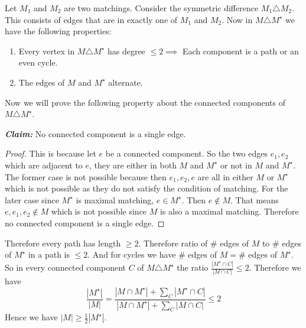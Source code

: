 \begin{alternate-proof} 
	Let $M_1$ and $M_2$ are two matchings. Consider the symmetric difference $M_1\triangle M_2$.  This consists of edges that are in exactly one of $M_1$ and $M_2$. Now in $M\triangle M^{\star}$ we have the following properties:
	\begin{enumerate}[label=(\alph*)]
		\item Every vertex in $M\triangle M^{\star}$ has degree $\leq 2\implies $ Each component is a path or an even cycle. 
		\item The edges of $M$ and $M^{\star}$ alternate. 
			\end{enumerate}
		Now we will prove the following property about the connected components of $M\triangle M^{\star}$.
		
\begin{center}
					
	\begin{minipage}{0.9\textwidth}
			\textit{\textbf{Claim:}}\hspace{1em} No connected component is a single edge. 
		
		\begin{proof}
			This is because let $e$ be a connected component. So the two edges $e_1,e_2$ which are adjacent to $e$,  they are either in both $M$ and $M^{\star}$ or not in $M$ and $M^{\star}$. The former case is not possible because then $e_1,e_2,e$ are all in either $M$ or $M^{\star}$ which is not possible as they do not satisfy the condition of matching. For the later case since $M^{\star}$ is maximal matching, $e\in M^{\star}$. Then $e\notin M$. That means $e,e_1,e_2\notin M$ which is not possible since $M$ is also a maximal matching. Therefore no connected component is a single edge.
		\end{proof}
	\end{minipage}
\end{center}

	
		Therefore every path has length $\geq 2$. Therefore ratio of $\#$ edges of $M$ to $\#$ edges of $M^{\star}$ in a path is $\leq 2$. And for cycles we have $\#$ edges of $M=\#$ edges of $M^{\star}$. So in every connected component $C$ of $M\triangle M^{\star}$ the ratio $\frac{|M^{\star}\cap C|}{|M\cap C|}\leq 2$. Therefore we have $$\frac{|M^{\star}|}{|M|}=\frac{|M\cap M^{\star}|+\sum\limits_{C}|M^{\star}\cap C|}{|M\cap M^{\star}|+\sum\limits_{C}|M\cap C|}\leq 2$$Hence we have $|M|\geq \frac12|M^\star|$.
		

\end{alternate-proof}
